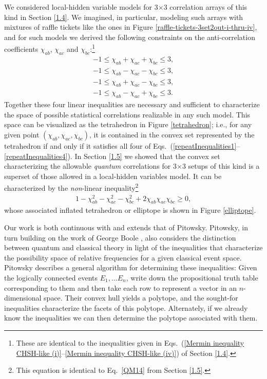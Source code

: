 We considered local-hidden variable models for 3$\times$3 correlation arrays of this kind in Section \ref{1.4}. We imagined, in particular, modeling such arrays with mixtures of raffle tickets like the ones in Figure \ref{raffle-tickets-3set2out-i-thru-iv}, and for such models we derived the following constraints on the anti-correlation coefficients $\chi_{ab}$, $\chi_{ac}$ and $\chi_{bc}$:\footnote{These are identical to the inequalities given in Eqs.\ (\ref{Mermin inequality CHSH-like (i)}--\ref{Mermin inequality CHSH-like (iv)}) of Section \ref{1.4}.}
\begin{align}
\label{repeatInequalities1}
-1 \leq \chi_{ab} + \chi_{ac} + \chi_{bc} \leq 3, \\[.3cm]
\label{repeatInequalities2}
-1 \leq \chi_{ab} - \chi_{ac} - \chi_{bc} \leq 3, \\[.3cm]
\label{repeatInequalities3}
-1 \leq \chi_{ab} + \chi_{ac} - \chi_{bc} \leq 3, \\[.3cm]
\label{repeatInequalities4}
-1 \leq \chi_{ab} - \chi_{ac} + \chi_{bc} \leq 3.
\end{align}
Together these four linear inequalities are necessary and sufficient to characterize the space of possible statistical correlations realizable in any such model. This space can be visualized as the tetrahedron in Figure \ref{tetrahedron}; i.e., for any given point $(\chi_{ab}, \chi_{ac}, \chi_{bc})$, it is contained in the convex set represented by the tetrahedron if and only if it satisfies all four of Eqs.\ (\ref{repeatInequalities1}--\ref{repeatInequalities4}). In Section \ref{1.5} we showed that the convex set characterizing the allowable \emph{quantum} correlations for 3$\times$3 setups of this kind is a superset of those allowed in a local-hidden variables model. It can be characterized by the \emph{non}-linear inequality\footnote{This equation is identical to Eq.\ \eqref{QM14} from Section \ref{1.5}.}
\begin{align}
\label{repeatElliptopeEqn}
1 - \chi^2_{ab} - \chi^2_{ac} - \chi^2_{bc} + 2\chi_{ab}\chi_{ac}\chi_{bc} \geq 0,
\end{align}
whose associated inflated tetrahedron or elliptope is shown in Figure \ref{elliptope}.

Our work is both continuous with and extends that of Pitowsky. Pitowsky, in turn building on the work of George Boole \citep{Pitowsky 1994}, also considers the distinction between quantum and classical theory in light of the inequalities that characterize the possibility space of relative frequencies for a given classical event space. Pitowsky describes a general algorithm for determining these inequalities: Given the logically connected events $E_1, \dots E_n$, write down the propositional truth table corresponding to them and then take each row to represent a vector in an $n$-dimensional space. Their convex hull yields a polytope, and the sought-for inequalities characterize the facets of this polytope. Alternately, if we already know the inequalities we can then determine the polytope associated with them.

